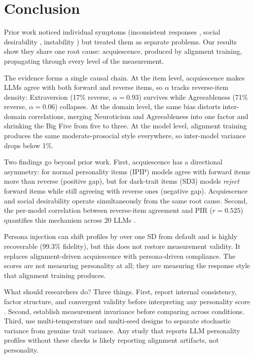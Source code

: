 \documentclass[11pt]{article}
\begin{document}
\section{Conclusion}

Prior work noticed individual symptoms (inconsistent responses \citep{suhr2025challenging}, social desirability \citep{acerbi2024llm}, instability \citep{pelet2025persistent}) but treated them as separate problems. Our results show they share one root cause: acquiescence, produced by alignment training, propagating through every level of the measurement.

The evidence forms a single causal chain. At the item level, acquiescence makes LLMs agree with both forward and reverse items, so $\alpha$ tracks reverse-item density: Extraversion (17\% reverse, $\alpha = 0.93$) survives while Agreeableness (71\% reverse, $\alpha = 0.06$) collapses. At the domain level, the same bias distorts inter-domain correlations, merging Neuroticism and Agreeableness into one factor and shrinking the Big Five from five to three. At the model level, alignment training produces the same moderate-prosocial style everywhere, so inter-model variance drops below 1\%.

Two findings go beyond prior work. First, acquiescence has a directional asymmetry: for normal personality items (IPIP) models agree with forward items more than reverse (positive gap), but for dark-trait items (SD3) models \emph{reject} forward items while still agreeing with reverse ones (negative gap). Acquiescence and social desirability operate simultaneously from the same root cause. Second, the per-model correlation between reverse-item agreement and PIR ($r = 0.525$) quantifies this mechanism across 20 LLMs \citep{acquiescence2025emnlp}.

Persona injection can shift profiles by over one SD from default and is highly recoverable (99.3\% fidelity), but this does not restore measurement validity. It replaces alignment-driven acquiescence with persona-driven compliance. The scores are not measuring personality at all; they are measuring the response style that alignment training produces.

What should researchers do? Three things. First, report internal consistency, factor structure, and convergent validity before interpreting any personality score \citep{huang2024reliability, serpell2024validity, cronbach1951coefficient, binz2023psychology}. Second, establish measurement invariance before comparing across conditions. Third, use multi-temperature and multi-seed designs to separate stochastic variance from genuine trait variance. Any study that reports LLM personality profiles without these checks is likely reporting alignment artifacts, not personality.
\end{document}
